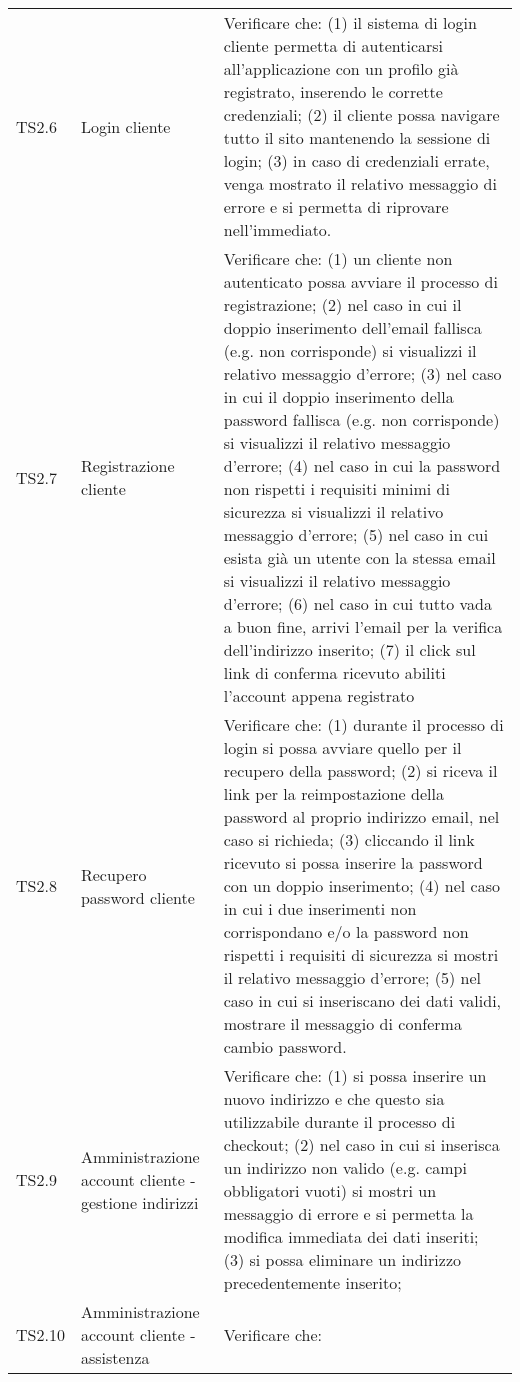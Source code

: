 \begin{center}
\begin{longtable}{|p{1cm}|p{6.85cm}|p{7cm}|}
	TS2.6 & Login cliente & Verificare che: (1) il sistema di login cliente permetta di autenticarsi all'applicazione con un profilo già registrato, inserendo le corrette credenziali;
											(2) il cliente possa navigare tutto il sito mantenendo la sessione di login;
											(3) in caso di credenziali errate, venga mostrato il relativo messaggio di errore e si permetta di riprovare nell'immediato. \\
	TS2.7 & Registrazione cliente & Verificare che: (1) un cliente non autenticato possa avviare il processo di registrazione;
													(2) nel caso in cui il doppio inserimento dell'email fallisca (e.g. non corrisponde) si visualizzi il relativo messaggio d'errore;
													(3) nel caso in cui il doppio inserimento della password fallisca (e.g. non corrisponde) si visualizzi il relativo messaggio d'errore;
													(4) nel caso in cui la password non rispetti i requisiti minimi di sicurezza si visualizzi il relativo messaggio d'errore;
													(5) nel caso in cui esista già un utente con la stessa email si visualizzi il relativo messaggio d'errore;
													(6) nel caso in cui tutto vada a buon fine, arrivi l'email per la verifica dell'indirizzo inserito;
													(7) il click sul link di conferma ricevuto abiliti l'account appena registrato \\
	TS2.8 & Recupero password cliente & Verificare che:
													(1) durante il processo di login si possa avviare quello per il recupero della password;
													(2) si riceva il link per la reimpostazione della password al proprio indirizzo email, nel caso si richieda;
													(3) cliccando il link ricevuto si possa inserire la password con un doppio inserimento;
													(4) nel caso in cui i due inserimenti non corrispondano e/o la password non rispetti i requisiti di sicurezza si mostri il relativo messaggio d'errore;
													(5) nel caso in cui si inseriscano dei dati validi, mostrare il messaggio di conferma cambio password. \\
	TS2.9 & Amministrazione account cliente - gestione indirizzi & Verificare che:
													(1) si possa inserire un nuovo indirizzo e che questo sia utilizzabile durante il processo di checkout; 
													(2) nel caso in cui si inserisca un indirizzo non valido (e.g. campi obbligatori vuoti) si mostri un messaggio di errore e si permetta la modifica immediata dei dati inseriti;
													(3) si possa eliminare un indirizzo precedentemente inserito; \\
	TS2.10 & Amministrazione account cliente - assistenza & Verificare che:

\end{longtable}
\end{center}
